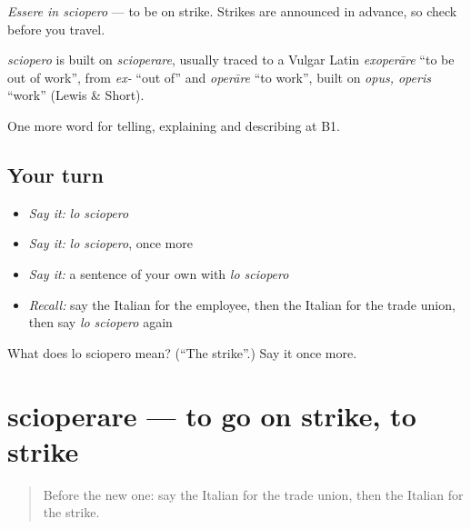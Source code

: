 \emph{Essere in sciopero} — to be on strike. Strikes are announced in advance, so check before you travel.

\begin{cousinweb}
\emph{sciopero} is built on \emph{scioperare}, usually traced to a Vulgar Latin \emph{exoperāre} \textquotedblleft{}to be out of work\textquotedblright{}, from \emph{ex-} \textquotedblleft{}out of\textquotedblright{} and \emph{operāre} \textquotedblleft{}to work\textquotedblright{}, built on \emph{opus, operis} \textquotedblleft{}work\textquotedblright{} (Lewis \& Short).
\end{cousinweb}

\begin{grammarlens}[title={What you've built}]
One more word for telling, explaining and describing at B1.
\end{grammarlens}

\subsection*{Your turn}
\begin{itemize}
\raggedright
  \item \emph{Say it:} \emph{lo sciopero}
  \item \emph{Say it:} \emph{lo sciopero}, once more
  \item \emph{Say it:} a sentence of your own with \emph{lo sciopero}
  \item \emph{Recall:} say the Italian for the employee, then the Italian for the trade union, then say \emph{lo sciopero} again
\end{itemize}

\begin{tcolorbox}[breakable,colback=teal!4,colframe=teal!35!black,title={Before you move on}]
What does lo sciopero mean? (\textquotedblleft{}The strike\textquotedblright{}.) Say it once more.
\end{tcolorbox}
\section[scioperare]{scioperare — to go on strike, to strike}

\label{lesson:IT-C359-scioperare}



\begin{quote}
Before the new one: say the Italian for the trade union, then the Italian for the strike.
\end{quote}

